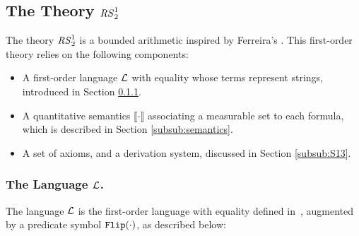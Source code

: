 






































\subsection{The Theory ${\mathit{RS}^1_2}$}\label{sec:S13}

The theory ${\mathit{RS}^1_2}$ is a bounded arithmetic inspired by Ferreira's \cite{Ferreira90}.
This first-order theory relies on the following components:

\begin{itemize}
  \item A first-order language $\mathcal{L}$ with equality whose terms represent strings, introduced in Section \ref{subsub:lpw}.
  \item A quantitative semantics $\llbracket \cdot\rrbracket$ associating a measurable set to each formula, which is described in Section \ref{subsub:semantics}.
  \item A set of axioms, and a derivation system, discussed in Section \ref{subsub:S13}.
\end{itemize}



\subsubsection{The Language $\mathcal{L}$.}\label{subsub:lpw}
The language $\mathcal{L}$ is the
first-order language
with equality defined in~\cite{FerreiraOitavem},
augmented by a predicate symbol
$\mathtt{Flip}(\cdot)$, as described below:


